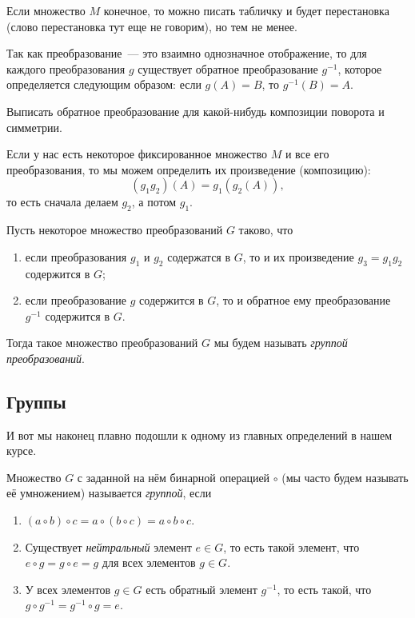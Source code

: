 	\begin{example}
		Если множество $M$ конечное, то можно писать табличку и будет перестановка (слово перестановка тут еще не говорим), но тем не менее. 
	\end{example}

	\begin{definition} 
		Так как преобразование~--- это взаимно однозначное отображение, то для каждого преобразования $g$ существует обратное преобразование $g^{-1}$, которое определяется следующим образом: если $g(A) = B$, то $g^{-1}(B) = A$.
	\end{definition}

	\begin{example}
		Выписать обратное преобразование для какой-нибудь композиции поворота и симметрии. 
	\end{example}

	Если у нас есть некоторое фиксированное множество $M$ и все его преобразования, то мы можем определить их произведение (композицию): 
	\[
		(g_1 g_2)(A) = g_1(g_2(A)),
	\]
	то есть сначала делаем $g_2$, а потом $g_1$. 

	\begin{definition} 
		Пусть некоторое множество преобразований $G$ таково, что 
		\begin{enumerate}
		 	\item если преобразования $g_1$ и $g_2$ содержатся в $G$, то и их произведение $g_3 = g_1g_2$ содержится в $G$;
		 	\item если преобразование $g$ содержится в $G$, то и обратное ему преобразование $g^{-1}$ содержится в $G$.
		 \end{enumerate}
		 Тогда такое множество преобразований $G$ мы будем называть \emph{группой преобразований}.
	\end{definition}
	

	\subsection{Группы}

	И вот мы наконец плавно подошли к одному из главных определений в нашем курсе. 

	\begin{definition} 
		Множество $G$ с заданной на нём бинарной операцией $\circ$ (мы часто будем называть её умножением) называется \emph{группой}, если 
		\begin{enumerate}
			\item $(a \circ b) \circ c = a \circ (b \circ c) = a \circ b \circ c$. 
			\item Существует \emph{нейтральный} элемент $e \in G$, то есть такой элемент, что $e \circ g = g \circ e = g$ для всех элементов $g \in G$. 
			\item У всех элементов $g \in G$ есть обратный элемент $g^{-1}$, то есть такой, что $g \circ g^{-1} = g^{-1} \circ g = e$.
		\end{enumerate}
	\end{definition}

